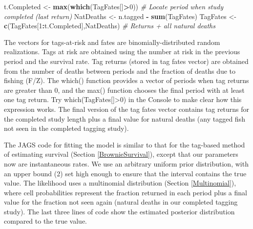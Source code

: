 \documentclass[
]{krantz}
\makeatletter
\newenvironment{Shaded}{\begin{snugshade}}{\end{snugshade}}
\newcommand{\CommentTok}[1]{\textcolor[rgb]{0.37,0.37,0.37}{\textit{#1}}}
\newcommand{\DecValTok}[1]{\textcolor[rgb]{0.06,0.06,0.06}{#1}}
\newcommand{\FunctionTok}[1]{\textcolor[rgb]{0.27,0.27,0.27}{\textbf{#1}}}
\newcommand{\NormalTok}[1]{#1}
\newcommand{\OtherTok}[1]{\textcolor[rgb]{0.37,0.37,0.37}{#1}}
\newcommand{\SpecialCharTok}[1]{\textcolor[rgb]{0.43,0.43,0.43}{\textbf{#1}}}
\newenvironment{kframe}{%
\medskip{}
\setlength{\fboxsep}{.8em}
 \def\at@end@of@kframe{}%
 \ifinner\ifhmode%
  \def\at@end@of@kframe{\end{minipage}}%
  \begin{minipage}{\columnwidth}%
 \fi\fi%
 \def\FrameCommand##1{\hskip\@totalleftmargin \hskip-\fboxsep
 \colorbox{shadecolor}{##1}\hskip-\fboxsep
     \hskip-\linewidth \hskip-\@totalleftmargin \hskip\columnwidth}%
 \MakeFramed {\advance\hsize-\width
   \@totalleftmargin\z@ \linewidth\hsize
   \@setminipage}}%
 {\par\unskip\endMakeFramed%
 \at@end@of@kframe}
\renewenvironment{Shaded}{\begin{kframe}}{\end{kframe}}
\makeatother
\begin{document}
\begin{Shaded}
\begin{Highlighting}[]
\NormalTok{t.Completed }\OtherTok{\textless{}{-}} \FunctionTok{max}\NormalTok{(}\FunctionTok{which}\NormalTok{(TagFates[]}\SpecialCharTok{\textgreater{}}\DecValTok{0}\NormalTok{))}
\CommentTok{\# Locate period when study completed (last return)}
\NormalTok{NatDeaths }\OtherTok{\textless{}{-}}\NormalTok{ n.tagged }\SpecialCharTok{{-}} \FunctionTok{sum}\NormalTok{(TagFates)}
\NormalTok{TagFates }\OtherTok{\textless{}{-}} \FunctionTok{c}\NormalTok{(TagFates[}\DecValTok{1}\SpecialCharTok{:}\NormalTok{t.Completed],NatDeaths) }
\CommentTok{\# Returns + all natural deaths}
\end{Highlighting}
\end{Shaded}

The vectors for tags-at-risk and fates are binomially-distributed random realizations. Tags at risk are obtained using the number at risk in the previous period and the survival rate. Tag returns (stored in tag fates vector) are obtained from the number of deaths between periods and the fraction of deaths due to fishing (F/Z). The which() function provides a vector of periods when tag returns are greater than 0, and the max() function chooses the final period with at least one tag return. Try which(TagFates{[}{]}\textgreater0) in the Console to make clear how this expression works. The final version of the tag fates vector contains tag returns for the completed study length plus a final value for natural deaths (any tagged fish not seen in the completed tagging study).

The JAGS code for fitting the model is similar to that for the tag-based method of estimating survival (Section \ref{BrownieSurvival}), except that our parameters now are instantaneous rates. We use an arbitrary uniform prior distribution, with an upper bound (2) set high enough to ensure that the interval contains the true value. The likelihood uses a multinomial distribution (Section \ref{Multinomial}), where cell probabilities represent the fraction returned in each period plus a final value for the fraction not seen again (natural deaths in our completed tagging study). The last three lines of code show the estimated posterior distribution compared to the true value.
\end{document}
